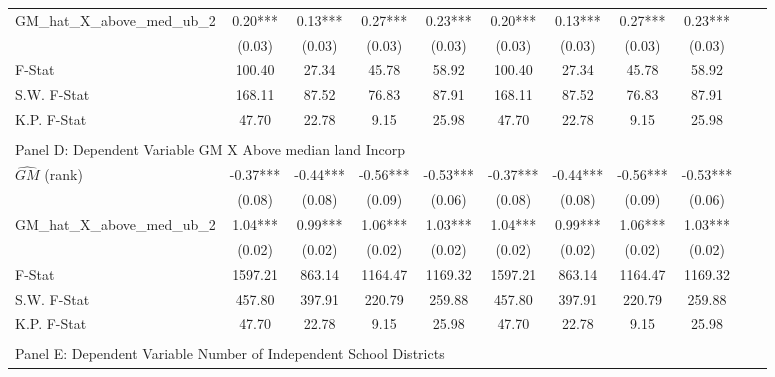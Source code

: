 \begin{table}[htbp]
\begin{threeparttable}
\begin{tabular}{l*{10}{c}}
\addlinespace
GM\_hat\_X\_above\_med\_ub\_2&       0.20***&       0.13***&       0.27***&       0.23***&       0.20***&       0.13***&       0.27***&       0.23***\\
                &     (0.03)   &     (0.03)   &     (0.03)   &     (0.03)   &     (0.03)   &     (0.03)   &     (0.03)   &     (0.03)   \\
\midrule
F-Stat          &     100.40   &      27.34   &      45.78   &      58.92   &     100.40   &      27.34   &      45.78   &      58.92   \\
S.W. F-Stat     &     168.11   &      87.52   &      76.83   &      87.91   &     168.11   &      87.52   &      76.83   &      87.91   \\
K.P. F-Stat     &      47.70   &      22.78   &       9.15   &      25.98   &      47.70   &      22.78   &       9.15   &      25.98   \\
\cmidrule[\heavyrulewidth](lr){1-9} \\ \cmidrule[\heavyrulewidth](lr){1-9}
\multicolumn{8}{l}{Panel D: Dependent Variable GM X Above median land Incorp}\\
\cmidrule(lr){1-9}
$\hat{GM}$ (rank)&      -0.37***&      -0.44***&      -0.56***&      -0.53***&      -0.37***&      -0.44***&      -0.56***&      -0.53***\\
                &     (0.08)   &     (0.08)   &     (0.09)   &     (0.06)   &     (0.08)   &     (0.08)   &     (0.09)   &     (0.06)   \\
\addlinespace
GM\_hat\_X\_above\_med\_ub\_2&       1.04***&       0.99***&       1.06***&       1.03***&       1.04***&       0.99***&       1.06***&       1.03***\\
                &     (0.02)   &     (0.02)   &     (0.02)   &     (0.02)   &     (0.02)   &     (0.02)   &     (0.02)   &     (0.02)   \\
\midrule
F-Stat          &    1597.21   &     863.14   &    1164.47   &    1169.32   &    1597.21   &     863.14   &    1164.47   &    1169.32   \\
S.W. F-Stat     &     457.80   &     397.91   &     220.79   &     259.88   &     457.80   &     397.91   &     220.79   &     259.88   \\
K.P. F-Stat     &      47.70   &      22.78   &       9.15   &      25.98   &      47.70   &      22.78   &       9.15   &      25.98   \\
\cmidrule[\heavyrulewidth](lr){1-9} \\ \cmidrule[\heavyrulewidth](lr){1-9}
\multicolumn{8}{l}{Panel E: Dependent Variable Number of Independent School Districts}\\

\end{tabular}
\end{threeparttable}
\end{table}
